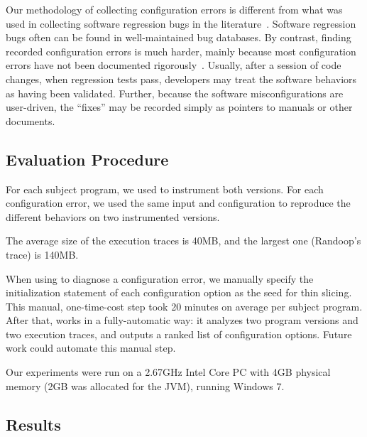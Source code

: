 Our methodology of collecting
configuration errors is different from what was used in
collecting software regression bugs in the literature~\cite{dd, autoflow}.
Software regression bugs often can be found in well-maintained
bug databases. By contrast, finding recorded configuration errors
is much harder, mainly because most configuration errors have not been
documented rigorously~\cite{Yin:2011:ESC}. Usually, after a
session of code changes, when regression tests pass, developers
may treat the software behaviors as having been validated. Further,
because the software misconfigurations are user-driven,
the ``fixes'' may be recorded simply as pointers
to manuals or other documents. 






\subsection{Evaluation Procedure}

For each subject program, we used \ourtool to instrument both versions. 
For each configuration error, we used the same 
input and configuration
to reproduce the different behaviors on two instrumented versions.

The average size of the execution traces is 40MB,
and the largest one (Randoop's trace) is 140MB.



When using \ourtool to diagnose a configuration error, we manually specify
the initialization statement of each configuration option as
the seed for thin slicing. This manual, one-time-cost step took 
20 minutes on average per subject program. After that,
\ourtool works in a fully-automatic way: it 
analyzes two program versions and two execution traces,
and outputs a ranked list of configuration options.
Future work could automate this manual step.

Our experiments were run on a 2.67GHz Intel Core PC
with 4GB physical memory (2GB was allocated for the JVM),
running Windows 7.

\subsection{Results}


